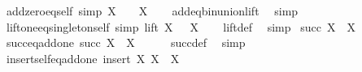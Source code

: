 \begin{isabellebody}
\begin{isamarkuptext}
\end{isamarkuptext}\isamarkuptrue%
\isamarkupfalse%
\ add{\isacharunderscore}{\kern0pt}zero{\isacharunderscore}{\kern0pt}eq{\isacharunderscore}{\kern0pt}self\ {\isacharbrackleft}{\kern0pt}simp{\isacharbrackright}{\kern0pt}{\isacharcolon}{\kern0pt}\ {\isachardoublequoteopen}X\ {\isacharplus}{\kern0pt}\ {}\ {\isacharequal}{\kern0pt}\ X{\isachardoublequoteclose}\isanewline
%
\isadelimproof
\ \ %
\endisadelimproof
%
\isatagproof
{}\isamarkupfalse%
\ add{\isacharunderscore}{\kern0pt}eq{\isacharunderscore}{\kern0pt}bin{\isacharunderscore}{\kern0pt}union{\isacharunderscore}{\kern0pt}lift\ \isamarkupfalse%
\ simp%
\endisatagproof
{\isafoldproof}%
%
\isadelimproof
\isanewline
%
\endisadelimproof
\isanewline
{}\isamarkupfalse%
\ lift{\isacharunderscore}{\kern0pt}one{\isacharunderscore}{\kern0pt}eq{\isacharunderscore}{\kern0pt}singleton{\isacharunderscore}{\kern0pt}self\ {\isacharbrackleft}{\kern0pt}simp{\isacharbrackright}{\kern0pt}{\isacharcolon}{\kern0pt}\ {\isachardoublequoteopen}lift\ X\ {}\ {\isacharequal}{\kern0pt}\ {\isacharbraceleft}{\kern0pt}X{\isacharbraceright}{\kern0pt}{\isachardoublequoteclose}\isanewline
%
\isadelimproof
\ \ %
\endisadelimproof
%
\isatagproof
{}\isamarkupfalse%
\ lift{\isacharunderscore}{\kern0pt}def\ \isamarkupfalse%
\ simp%
\endisatagproof
{\isafoldproof}%
%
\isadelimproof
\isanewline
%
\endisadelimproof
\isanewline
{}\isamarkupfalse%
\ {\isachardoublequoteopen}succ\ X\ {\isasymequiv}\ X\ {\isacharplus}{\kern0pt}\ {}{\isachardoublequoteclose}\isanewline
\isanewline
{}\isamarkupfalse%
\ succ{\isacharunderscore}{\kern0pt}eq{\isacharunderscore}{\kern0pt}add{\isacharunderscore}{\kern0pt}one{\isacharcolon}{\kern0pt}\ {\isachardoublequoteopen}succ\ X\ {\isacharequal}{\kern0pt}\ X\ {\isacharplus}{\kern0pt}\ {}{\isachardoublequoteclose}\isanewline
%
\isadelimproof
\ \ %
\endisadelimproof
%
\isatagproof
{}\isamarkupfalse%
\ succ{\isacharunderscore}{\kern0pt}def\ \isamarkupfalse%
\ simp%
\endisatagproof
{\isafoldproof}%
%
\isadelimproof
\isanewline
%
\endisadelimproof
\isanewline
{}\isamarkupfalse%
\ insert{\isacharunderscore}{\kern0pt}self{\isacharunderscore}{\kern0pt}eq{\isacharunderscore}{\kern0pt}add{\isacharunderscore}{\kern0pt}one{\isacharcolon}{\kern0pt}\ {\isachardoublequoteopen}insert\ X\ X\ {\isacharequal}{\kern0pt}\ X\ {\isacharplus}{\kern0pt}\ {}{\isachardoublequoteclose}\isanewline

\end{isabellebody}
